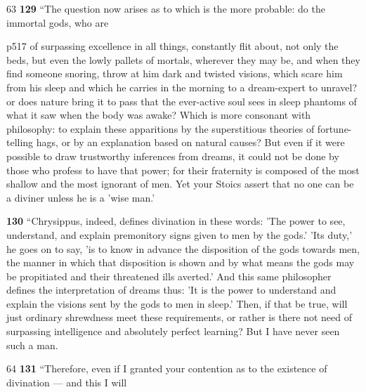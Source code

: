 63
\textbf{129} ``The question now arises as to which is the more probable: do the immortal gods, who are

p517 of surpassing excellence in all things, constantly flit about, not only the beds, but even the lowly pallets of mortals, wherever they may be, and when they find someone snoring, throw at him dark and twisted visions, which scare him from his sleep and which he carries in the morning to a dream-expert to unravel? or does nature bring it to pass that the ever-active soul sees in sleep phantoms of what it saw when the body was awake? Which is more consonant with philosophy: to explain these apparitions by the superstitious theories of fortune-telling hags, or by an explanation based on natural causes? But even if it were possible to draw trustworthy inferences from dreams, it could not be done by those who profess to have that power; for their fraternity is composed of the most shallow and the most ignorant of men. Yet your Stoics assert that no one can be a diviner unless he is a 'wise man.'

\textbf{130} ``Chrysippus, indeed, defines divination in these words: 'The power to see, understand, and explain premonitory signs given to men by the gods.' 'Its duty,' he goes on to say, 'is to know in advance the disposition of the gods towards men, the manner in which that disposition is shown and by what means the gods may be propitiated and their threatened ills averted.' And this same philosopher defines the interpretation of dreams thus: 'It is the power to understand and explain the visions sent by the gods to men in sleep.' Then, if that be true, will just ordinary shrewdness meet these requirements, or rather is there not need of surpassing intelligence and absolutely perfect learning? But I have never seen such a man.

64
\textbf{131} ``Therefore, even if I granted your contention as to the existence of divination \texthebrew{—} and this I will

